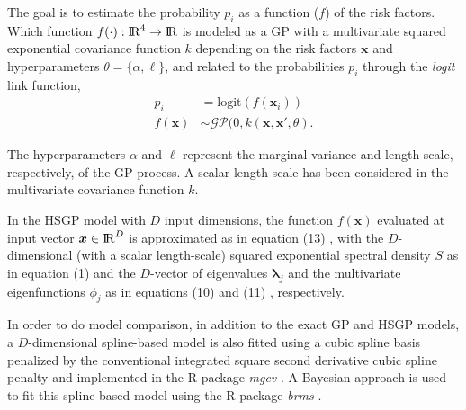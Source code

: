 \documentclass[onecolumn,a4paper,11pt]{article}
\begin{document}
\noindent The goal is to estimate the probability $p_i$ as a function ($f$) of the risk factors. Which function $f(\cdot):{\rm I\!R}^{4} \to {\rm I\!R}$ is modeled as a GP with a multivariate squared exponential covariance function $k$ depending on the risk factors $\bm{x}$ and hyperparameters $\theta=\{\alpha,\ell\}$, and related to the probabilities $p_i$ through the {\it logit} link function,
%
\begin{align*} \label{ch5_eq_gpprior_gay}
p_i &= \mathrm{logit}(f(\bm{x}_i)) \nonumber \\
f(\bm{x}) &\sim \mathcal{GP}(0, k(\bm{x},\bm{x}', \theta).
\end{align*}

\noindent The hyperparameters $\alpha$ and $\ell$ represent the marginal variance and length-scale, respectively, of the GP process. A scalar length-scale has been considered in the multivariate covariance function $k$.

In the HSGP model with $D$ input dimensions, the function $f(\bm{x})$ evaluated at input vector $\bm{x} \in {\rm I\!R}^D$ is approximated as in equation (13)%
, with the $D$-dimensional (with a scalar length-scale) squared exponential spectral density $S$ as in equation (1) %
and the $D$-vector of eigenvalues $\bm{\lambda}_j$ and the multivariate eigenfunctions $\phi_j$ as in equations (10) %
and (11)%
, respectively.


In order to do model comparison, in addition to the exact GP and HSGP models, a $D$-dimensional spline-based model is also fitted using a cubic spline basis penalized by the conventional integrated square second derivative cubic spline penalty \citep{wood2017generalized} and implemented in the R-package \textit{mgcv} \citep{wood2011mgcv}. A Bayesian approach is used to fit this spline-based model using the R-package \textit{brms} \citep{burkner2017brms}.
\end{document}
